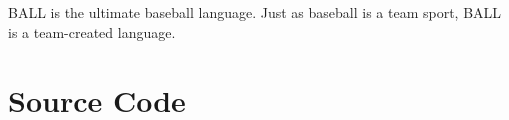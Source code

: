 \documentclass[letterpaper,oneside,12pt, pdftex]{report}
\begin{document}
BALL is the ultimate baseball language. Just as baseball is a team
sport, BALL is a team-created language.








\clearpage
\chapter{Source Code}




\clearpage
{}
\listoffigures

\clearpage
{}
\listoftables


\appendix

\end{document}

